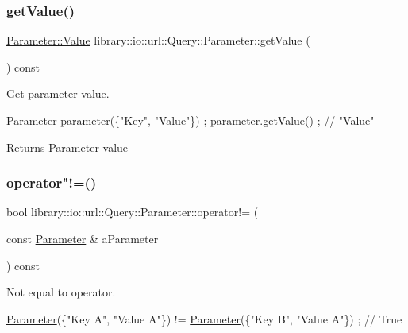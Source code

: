 \subsubsection{\texorpdfstring{get\+Value()}{getValue()}}
{\footnotesize\ttfamily \hyperlink{classlibrary_1_1io_1_1url_1_1_query_1_1_parameter_a46e7a7b97d44f51f83d6261f70ba0a5e}{Parameter\+::\+Value} library\+::io\+::url\+::\+Query\+::\+Parameter\+::get\+Value (\begin{DoxyParamCaption}{ }\end{DoxyParamCaption}) const}



Get parameter value. 


\begin{DoxyCode}
\hyperlink{classlibrary_1_1io_1_1url_1_1_query_1_1_parameter_ad6160646a07cb92213403426dbba4c64}{Parameter} parameter(\{\textcolor{stringliteral}{"Key"}, \textcolor{stringliteral}{"Value"}\}) ;
parameter.getValue() ; \textcolor{comment}{// "Value"}
\end{DoxyCode}


\begin{DoxyReturn}{Returns}
\hyperlink{classlibrary_1_1io_1_1url_1_1_query_1_1_parameter}{Parameter} value 
\end{DoxyReturn}
\mbox{\label{classlibrary_1_1io_1_1url_1_1_query_1_1_parameter_a5c57390202d4bfb16ef94252f1d4618d}} 
\subsubsection{\texorpdfstring{operator"!=()}{operator!=()}}
{\footnotesize\ttfamily bool library\+::io\+::url\+::\+Query\+::\+Parameter\+::operator!= (\begin{DoxyParamCaption}\item[{const \hyperlink{classlibrary_1_1io_1_1url_1_1_query_1_1_parameter}{Parameter} \&}]{a\+Parameter }\end{DoxyParamCaption}) const}



Not equal to operator. 


\begin{DoxyCode}
\hyperlink{classlibrary_1_1io_1_1url_1_1_query_1_1_parameter_ad6160646a07cb92213403426dbba4c64}{Parameter}(\{\textcolor{stringliteral}{"Key A"}, \textcolor{stringliteral}{"Value A"}\}) != \hyperlink{classlibrary_1_1io_1_1url_1_1_query_1_1_parameter_ad6160646a07cb92213403426dbba4c64}{Parameter}(\{\textcolor{stringliteral}{"Key B"}, \textcolor{stringliteral}{"Value A"}\}) ; \textcolor{comment}{// True}
\end{DoxyCode}



